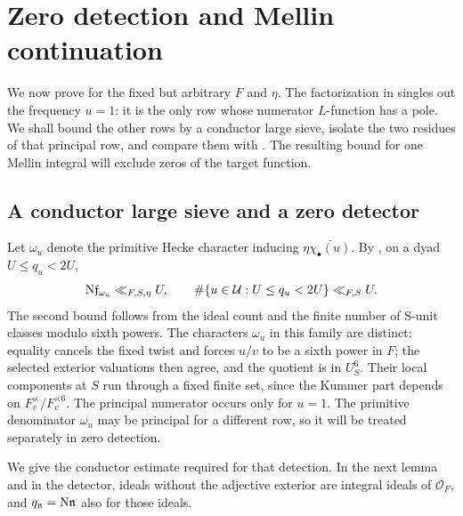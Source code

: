 \section{Zero detection and Mellin continuation}\label{sec:zero-free}

We now prove  for the fixed but arbitrary
\(F\) and \(\eta\).  The factorization in
 singles out the frequency \(u=1\): it is the
only row whose numerator \(L\)-function has a pole.  We shall bound the
other rows by a conductor large sieve, isolate the two residues of that
principal row, and compare them with .  The resulting
bound for one Mellin integral will exclude zeros of the target function.

\subsection{A conductor large sieve and a zero detector}

Let \(\omega_u\) denote the primitive Hecke character inducing
\(\eta\overline{\chi_\bullet(u)}\).  By
, on a dyad \(U\le q_u<2U\),
\begin{equation}
 \mathrm{N}\mathfrak f_{\omega_u}\ll_{F,S,\eta}U,
 \qquad
 \#\{u\in\mathcal U:U\le q_u<2U\}\ll_{F,S}U .
\label{eq:row-conductor-count}
\end{equation}
The second bound follows from the ideal count and the finite number of
S-unit classes modulo sixth powers.  The characters \(\omega_u\) in this
family are distinct: equality cancels the fixed twist and forces \(u/v\)
to be a sixth power in \(F\); the selected exterior valuations then agree,
and the quotient is in \(U_S^6\).  Their local components at \(S\) run
through a fixed finite set, since the Kummer part depends on
\(F_v^\times/F_v^{\times6}\).  The principal numerator occurs only for
\(u=1\).  The primitive denominator \(\omega_u\) may be principal for
a different row, so it will be treated separately in zero detection.

We give the conductor estimate required for that detection.  In the next
lemma and in the detector, ideals without the adjective exterior are
integral ideals of \(\mathcal O_F\), and \(q_{\mathfrak n}=\mathrm{N}\mathfrak n\)
also for those ideals.

